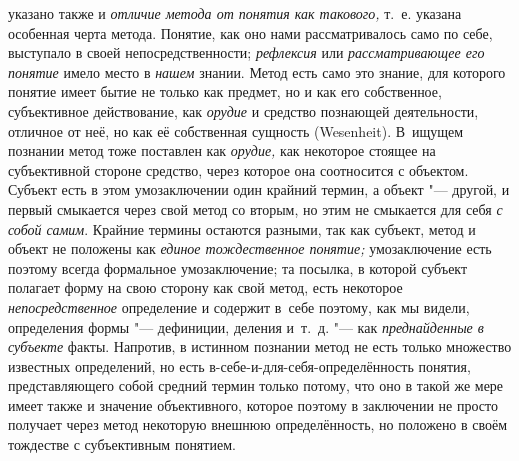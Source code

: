 указано также и {\em отличие метода от понятия как
такового,} т.~е. указана особенная черта метода. Понятие,
как оно нами рассматривалось само по себе, выступало в своей
непосредственности; {\em рефлексия} или {\em рассматривающее
его понятие} имело место в {\em нашем} знании. Метод
есть само это знание, для которого понятие имеет бытие не только как
предмет, но и как его собственное, субъективное действование, как
{\em орудие} и средство
познающей деятельности, отличное от неё, но как её собственная сущность
(Wesenheit). В~ищущем познании метод тоже поставлен как {\em орудие,} как
некоторое стоящее на субъективной стороне средство, через которое она
соотносится с объектом. Субъект есть в этом умозаключении один крайний
термин, а объект "--- другой, и первый смыкается через свой
метод со вторым, но этим не смыкается для себя {\em с собой самим}.
Крайние термины остаются разными, так как субъект, метод и
объект не положены как {\em единое
тождественное понятие;} умозаключение есть поэтому всегда
формальное умозаключение; та посылка, в которой субъект полагает форму на
свою сторону как свой метод, есть некоторое {\em непосредственное}
определение и содержит в~себе поэтому, как мы видели, определения
формы "--- дефиниции, деления и~т.~д. "--- как {\em преднайденные в
субъекте} факты. Напротив, в истинном познании метод не есть
только множество известных определений, но есть
в-себе-и-для-себя-определённость понятия, представляющего собой средний
термин только потому, что оно в такой же мере имеет также и значение
объективного, которое поэтому в заключении не просто получает через метод
некоторую внешнюю определённость, но положено в своём тождестве с
субъективным понятием.

